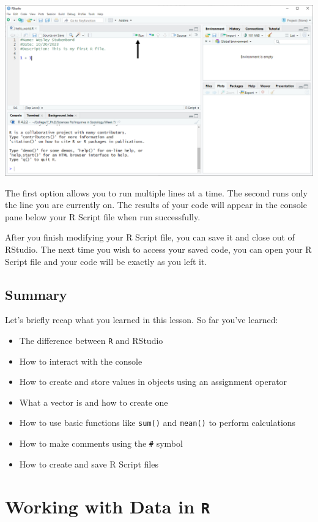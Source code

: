 \documentclass[
]{book}
\providecommand{\tightlist}{%
  \setlength{\itemsep}{0pt}\setlength{\parskip}{0pt}}
\begin{document}
\includegraphics{docs/_main_files/figure-html/RStudio_Run button.png}

The first option allows you to run multiple lines at a time. The second runs only the line you are currently on. The results of your code will appear in the console pane below your R Script file when run successfully.

After you finish modifying your R Script file, you can save it and close out of RStudio. The next time you wish to access your saved code, you can open your R Script file and your code will be exactly as you left it.

\hypertarget{summary}{%
\section{Summary}\label{summary}}

Let's briefly recap what you learned in this lesson. So far you've learned:

\begin{itemize}
\tightlist
\item
  The difference between \texttt{R} and RStudio
\item
  How to interact with the console
\item
  How to create and store values in objects using an assignment operator
\item
  What a vector is and how to create one
\item
  How to use basic functions like \texttt{sum()} and \texttt{mean()} to perform calculations
\item
  How to make comments using the \texttt{\#} symbol
\item
  How to create and save R Script files
\end{itemize}

\hypertarget{working-with-data-in-r}{%
\chapter{\texorpdfstring{Working with Data in \texttt{R}}{Working with Data in R}}\label{working-with-data-in-r}}
\end{document}
